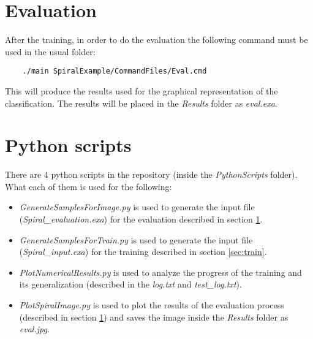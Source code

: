 \documentclass{article}
\begin{document}
\section{Evaluation} \label{sec:eval}
After the training, in order to do the evaluation the following command must be used in the usual folder: 

\begin{verbatim}
	./main SpiralExample/CommandFiles/Eval.cmd
\end{verbatim}

This will produce the results used for the graphical representation of the classification. The results will be placed in the \textit{Results} folder as \textit{eval.exa}.

\section{Python scripts}
There are 4 python scripts in the repository (inside the \textit{PythonScripts} folder). What each of them is used for the following:

\begin{itemize}
	\item \textit{GenerateSamplesForImage.py} is used to generate the input file (\textit{Spiral\_evaluation.exa}) for the evaluation described in section \ref{sec:eval}.
	
	\item \textit{GenerateSamplesForTrain.py} is used to generate the input file (\textit{Spiral\_input.exa}) for the training described in section \ref{sec:train}.
	
	\item \textit{PlotNumericalResults.py} is used to analyze the progress of the training and its generalization (described in the \textit{log.txt} and \textit{test\_log.txt}).
	
	\item \textit{PlotSpiralImage.py} is used to plot the results of the evaluation process (described in section \ref{sec:eval}) and saves the image inside the \textit{Results} folder as \textit{eval.jpg}.
\end{itemize}

\clearpage
\printbibliography
\end{document}
